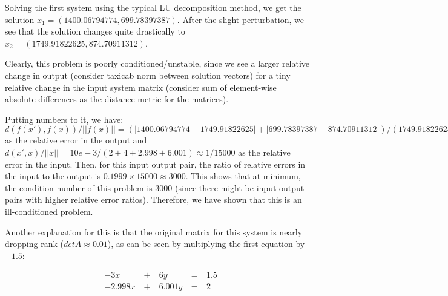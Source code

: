 Solving the first system using the typical LU decomposition method, we get the solution $x_1 = (1400.06794774, 699.78397387)$. After the slight perturbation, we see that the solution changes quite drastically to $x_2 = (1749.91822625, 874.70911312)$.\bigskip

Clearly, this problem is poorly conditioned/unstable, since we see a larger relative change in output (consider taxicab norm between solution vectors) for a tiny relative change in the input system matrix (consider sum of element-wise absolute differences as the distance metric for the matrices).\bigskip

Putting numbers to it, we have: $d(f(x'), f(x))/||f(x)|| = (|1400.06794774 - 1749.91822625| + |699.78397387 - 874.70911312|) / (1749.91822625 + 874.70911312) = 524.77541776/2624.62733937 \approx 0.1999$ as the relative error in the output and $d(x', x)/||x|| = 10e-3/(2 + 4 + 2.998 + 6.001) \approx 1/15000$ as the relative error in the input. Then, for this input output pair, the ratio of relative errors in the input to the output is $0.1999 \times 15000 \approx 3000$. This shows that at minimum, the condition number of this problem is $3000$ (since there might be input-output pairs with higher relative error ratios). Therefore, we have shown that this is an ill-conditioned problem.\bigskip

Another explanation for this is that the original matrix for this system is nearly dropping rank ($det A \approx 0.01$), as can be seen by multiplying the first equation by $-1.5$:

\begin{align*}
	&-3x &\ +\ & 6y &\ =\ & 1.5\\
	&-2.998x &\ +\ & 6.001y &\ =\ & 2
\end{align*}